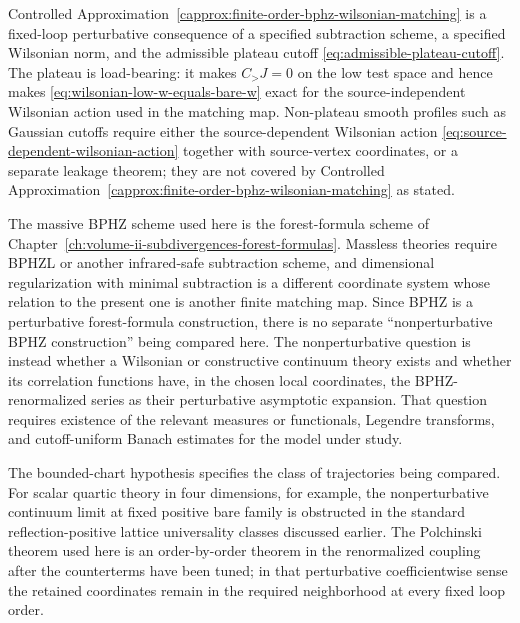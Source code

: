 \begin{remark}
Controlled Approximation~\ref{capprox:finite-order-bphz-wilsonian-matching}
is a fixed-loop perturbative consequence of a specified subtraction
scheme, a specified Wilsonian norm, and the admissible plateau cutoff
\eqref{eq:admissible-plateau-cutoff}.  The plateau is load-bearing: it makes
\(C_>J=0\) on the low test space and hence makes
\eqref{eq:wilsonian-low-w-equals-bare-w} exact for the source-independent
Wilsonian action used in the matching map.  Non-plateau smooth profiles such
as Gaussian cutoffs require either the source-dependent Wilsonian action
\eqref{eq:source-dependent-wilsonian-action} together with source-vertex
coordinates, or a separate leakage theorem; they are not covered by
Controlled Approximation~\ref{capprox:finite-order-bphz-wilsonian-matching}
as stated.

The massive BPHZ scheme used here is
the forest-formula scheme of
Chapter~\ref{ch:volume-ii-subdivergences-forest-formulas}.  Massless theories require
BPHZL or another infrared-safe subtraction scheme, and dimensional
regularization with minimal subtraction is a different coordinate system whose
relation to the present one is another finite matching map.  Since BPHZ is a
perturbative forest-formula construction, there is no separate
``nonperturbative BPHZ construction'' being compared here.  The
nonperturbative question is instead whether a Wilsonian or constructive
continuum theory exists and whether its correlation functions have, in the
chosen local coordinates, the BPHZ-renormalized series as their perturbative
asymptotic expansion.  That question requires existence of the relevant
measures or functionals, Legendre transforms, and cutoff-uniform Banach
estimates for the model under study.

The bounded-chart hypothesis specifies the class of trajectories being
compared.  For scalar quartic theory in four dimensions, for example, the
nonperturbative continuum limit at fixed positive bare family is obstructed
in the standard reflection-positive lattice universality classes discussed
earlier.  The Polchinski theorem used here is an order-by-order theorem in
the renormalized coupling after the counterterms have been tuned; in that
perturbative coefficientwise sense the retained coordinates remain in the
required neighborhood at every fixed loop order.
\end{remark}

